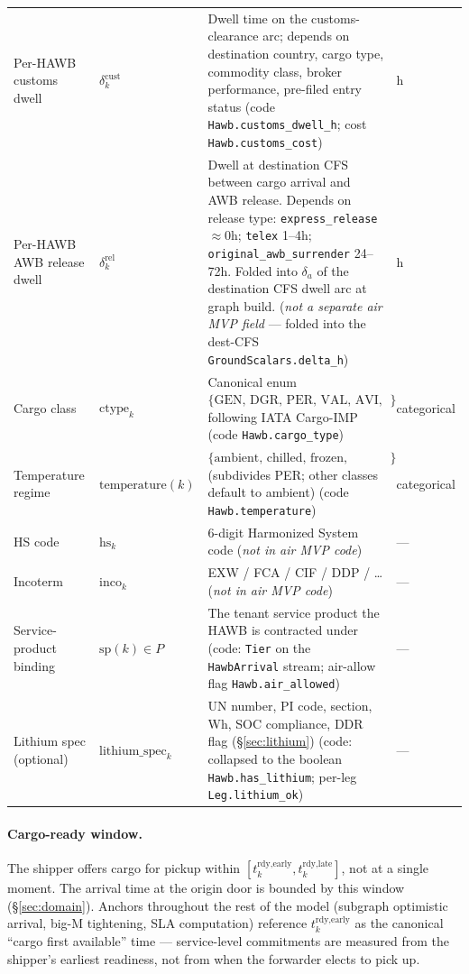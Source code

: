 \documentclass[11pt,a4paper]{article}
\newcommand{\ctype}{\text{ctype}}
\theoremstyle{definition}
\begin{document}
\begin{table}[H]
\begin{tabular}{p{3.5cm}p{2.2cm}p{6.5cm}p{1.5cm}}
Per-HAWB customs dwell & $\delta^{\text{cust}}_k$ & Dwell time on the customs-clearance arc; depends on destination country, cargo type, commodity class, broker performance, pre-filed entry status (code \texttt{Hawb.customs\_dwell\_h}; cost \texttt{Hawb.customs\_cost}) & h \\
Per-HAWB AWB release dwell & $\delta^{\text{rel}}_k$ & Dwell at destination CFS between cargo arrival and AWB release. Depends on release type: \texttt{express\_release} $\approx 0$h; \texttt{telex} 1--4h; \texttt{original\_awb\_surrender} 24--72h. Folded into $\delta_a$ of the destination CFS dwell arc at graph build. (\emph{not a separate air MVP field} --- folded into the dest-CFS \texttt{GroundScalars.delta\_h}) & h \\
Cargo class & $\ctype_k$ & Canonical enum $\{\text{GEN, DGR, PER, VAL, AVI, HUM}\}$ following IATA Cargo-IMP (code \texttt{Hawb.cargo\_type}) & categorical \\
Temperature regime & $\text{temperature}(k)$ & $\{\text{ambient, chilled, frozen, pharma}\}$ (subdivides PER; other classes default to ambient) (code \texttt{Hawb.temperature}) & categorical \\
HS code & $\text{hs}_k$ & 6-digit Harmonized System code (\emph{not in air MVP code}) & --- \\
Incoterm & $\text{inco}_k$ & EXW / FCA / CIF / DDP / \ldots (\emph{not in air MVP code}) & --- \\
Service-product binding & $\text{sp}(k) \in P$ & The tenant service product the HAWB is contracted under (code: \texttt{Tier} on the \texttt{HawbArrival} stream; air-allow flag \texttt{Hawb.air\_allowed}) & --- \\
Lithium spec (optional) & $\text{lithium\_spec}_k$ & UN number, PI code, section, Wh, SOC compliance, DDR flag (\S\ref{sec:lithium}) (code: collapsed to the boolean \texttt{Hawb.has\_lithium}; per-leg \texttt{Leg.lithium\_ok}) & --- \\
\bottomrule
\end{tabular}
\end{table}

\paragraph{Cargo-ready window.}
The shipper offers cargo for pickup within $[t_k^{\text{rdy,early}},
t_k^{\text{rdy,late}}]$, not at a single moment. The arrival time at the
origin door is bounded by this window (\S\ref{sec:domain}). Anchors throughout
the rest of the model (subgraph optimistic arrival, big-M tightening, SLA
computation) reference $t_k^{\text{rdy,early}}$ as the canonical ``cargo first
available'' time --- service-level commitments are measured from the shipper's
earliest readiness, not from when the forwarder elects to pick up.
\end{document}
